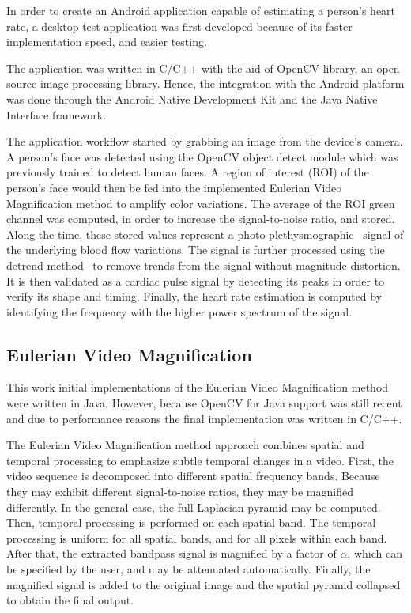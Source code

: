 \documentclass[9pt,a4paper]{extarticle}
\newcommand{\evm}{Eulerian Video Magnification}
\begin{document}
\begin{multicols}{2}
In order to create an Android application capable of estimating a person's
heart rate, a desktop test application was first developed because of
its faster implementation speed, and easier testing.

The application was written in C/C++ with the aid of OpenCV library, an
open-source image processing library. Hence, the integration with the Android
platform was done through the Android Native Development Kit and the
Java Native Interface framework.

The application workflow started by grabbing an image from the device's
camera. A person's face was detected using the OpenCV object detect module
which was previously trained to detect human faces. A region of interest (ROI)
of the person's face would then be fed into the implemented \evm{} method to
amplify color variations. The average of the ROI green channel was computed,
in order to increase the signal-to-noise ratio, and stored. Along the time,
these stored values represent a
photo-plethysmographic~\cite{Verkruysse2008Remote} signal of the underlying
blood flow variations. The signal is further processed using the detrend
method~\cite{Tarvainen2002Advanced}
to remove trends from the signal without magnitude distortion. It is then
validated as a cardiac pulse signal by detecting its peaks in order to
verify its shape and timing. Finally, the heart rate estimation is
computed by identifying the frequency with the higher power spectrum of
the signal.

\subsection{Eulerian Video Magnification}\label{sec:work:evm}

This work initial implementations of the \evm{} method were written in Java.
However, because OpenCV for Java support was still recent and due to performance
reasons the final implementation was written in C/C++.

The \evm{} method approach combines
spatial and temporal processing to emphasize subtle temporal changes
in a video. First, the video sequence is decomposed into different
spatial frequency bands. Because they may exhibit different
signal-to-noise ratios, they may be magnified differently.
In the general case, the full Laplacian pyramid
may be computed. Then, temporal processing is performed on each
spatial band. The temporal processing is uniform for all spatial
bands, and for all pixels within each band. After that, the extracted
bandpass signal is magnified by a factor of $\alpha$, which can be
specified by the user, and may be attenuated automatically. Finally,
the magnified signal is added to the original image and the spatial pyramid
collapsed to obtain the final output.


\end{multicols}
\end{document}
